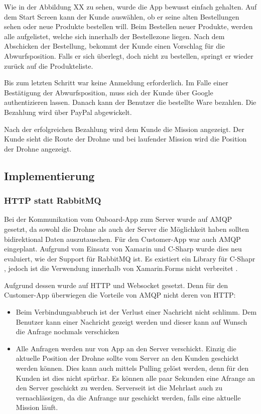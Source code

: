 Wie in der Abbildung XX zu sehen, wurde die App bewusst einfach gehalten.
Auf dem Start Screen kann der Kunde auswählen, ob er seine alten Bestellungen sehen oder neue Produkte bestellen will.
Beim Bestellen neuer Produkte, werden alle aufgelistet, welche sich innerhalb der Bestellezone liegen.
Nach dem Abschicken der Bestellung, bekommt der Kunde einen Vorschlag für die Abwurfsposition.
Falls er sich überlegt, doch nicht zu bestellen, springt er wieder zurück auf die Produkteliste.

Bis zum letzten Schritt war keine Anmeldung erforderlich.
Im Falle einer Bestätigung der Abwurfsposition, muss sich der Kunde über Google authentizieren lassen.
Danach kann der Benutzer die bestellte Ware bezahlen.
Die Bezahlung wird über PayPal abgewickelt.

Nach der erfolgreichen Bezahlung wird dem Kunde die Mission angezeigt.
Der Kunde sieht die Route der Drohne und bei laufender Mission wird die Position der Drohne angezeigt.

\subsection{Implementierung}

\subsubsection{HTTP statt RabbitMQ}
Bei der Kommunikation vom Onboard-App zum Server wurde auf AMQP gesetzt, da sowohl die Drohne als auch der Server die Möglichkeit haben sollten bidirektional Daten auszutauschen. 
Für den Customer-App war auch AMQP eingeplant. Aufgrund vom Einsatz von Xamarin und C-Sharp wurde dies neu evaluiert, wie der Support für RabbitMQ ist.
Es existiert ein Library für C-Shapr \cite{easynetq}, jedoch ist die Verwendung innerhalb von Xamarin.Forms nicht verbreitet \cite{amqp-csharp}. 

Aufgrund dessen wurde auf HTTP und Websocket gesetzt.
Denn für den Customer-App überwiegen die Vorteile von AMQP nicht deren von HTTP:
\begin{itemize}
	\item{
	Beim Verbindungsabbruch ist der Verlust einer Nachricht nicht schlimm.
	Dem Benutzer kann einer Nachricht gezeigt werden und dieser kann auf Wunsch die Anfrage nochmals verschicken}
	\item{
	    Alle Anfragen werden nur von App an den Server verschickt.
	    Einzig die aktuelle Position der Drohne sollte vom Server an den Kunden geschickt werden können.
	    Dies kann auch mittels Pulling gelöst werden, denn für den Kunden ist dies nicht spürbar.
	    Es können alle paar Sekunden eine Afrange an den Server geschickt zu werden.
	    Serverseit ist die Mehrlast auch zu vernachlässigen, da die Anfrange nur geschickt werden,
	    falls eine aktuelle Mission läuft.
	}
\end{itemize}

